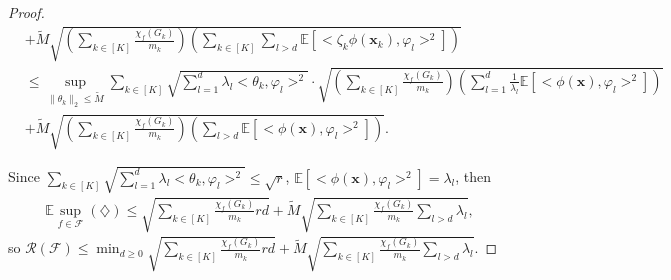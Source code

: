 \documentclass{article}
\def\vx{{\mathbf{x}}}
\def\eE{\mathbb{E}}
\begin{document}
\begin{proof}
\begin{align*}
    & + \widetilde{M}  \sqrt{ \left( \sum_{k \in [K]} \frac{\chi_f(G_k)}{m_k} \right) \left( \sum_{k \in [K]} \sum_{l > d} \eE[ < \zeta_k \phi (\vx_k), \varphi _l>^2 ] \right) }\\
    & \leq \sup_{\|\theta_k\|_2 \leq \widetilde{M}}  \sum_{k \in [K]} \sqrt{\sum_{l=1}^d \lambda_l<\theta_k, \varphi_l>^2} \cdot \sqrt{ \left( \sum_{k \in [K]} \frac{\chi_f(G_k)}{m_k} \right) \left( \sum _{l=1}^{d} \frac{1}{\lambda _l} \eE [< \phi(\vx), \varphi _l>^2] \right) } \\
    & + \widetilde{M}  \sqrt{ \left( \sum_{k \in [K]} \frac{\chi_f(G_k)}{m_k} \right) \left( \sum_{l > d} \eE[ <  \phi (\vx), \varphi _l>^2 ] \right) }.    
\end{align*}

Since $\sum_{k \in [K]} \sqrt{\sum_{l=1}^d \lambda_l<\theta_k, \varphi_l>^2} \leq \sqrt{r}$, $\eE [<\phi(\vx), \varphi_l>^2] = \lambda_l$, then
\begin{align*}
    \eE \sup_{f \in \mathcal{F}} (\diamondsuit) \leq \sqrt{\sum _{k \in [K]} \frac{\chi_f(G_k)}{m_k} r d } +\widetilde{M} \sqrt{\sum_{k \in [K]} \frac{\chi_f(G_k)}{m_k} \sum_{l > d} \lambda_l },
\end{align*}
so $\mathcal{R}(\mathcal{F}) \leq \min_{d \geq 0} \sqrt{\sum _{k \in [K]} \frac{\chi_f(G_k)}{m_k} r d } +\widetilde{M} \sqrt{\sum_{k \in [K]} \frac{\chi_f(G_k)}{m_k} \sum_{l > d} \lambda_l } $.   
\end{proof}
\end{document}
